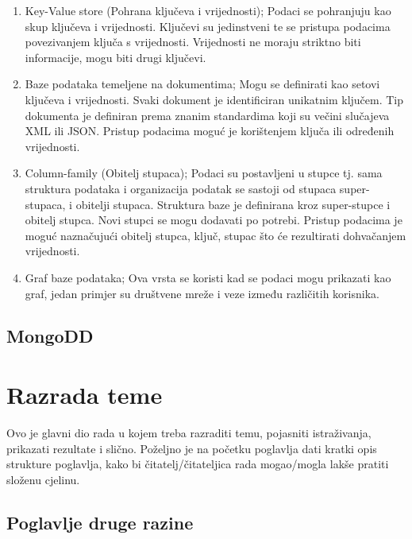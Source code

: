\documentclass[]{foi}
\begin{document}
\begin{enumerate}
    \item Key-Value store (Pohrana ključeva i vrijednosti); Podaci se pohranjuju kao skup ključeva i vrijednosti.
        Ključevi su jedinstveni te se pristupa podacima povezivanjem ključa s vrijednosti.
        Vrijednosti ne moraju striktno biti informacije, mogu biti drugi ključevi.
    \item Baze podataka temeljene na dokumentima; Mogu se definirati kao setovi ključeva i vrijednosti.
        Svaki dokument je identificiran unikatnim ključem. Tip dokumenta je definiran prema znanim standardima
        koji su večini slučajeva XML ili JSON. Pristup podacima moguć je korištenjem ključa ili određenih vrijednosti.
    \item Column-family (Obitelj stupaca); Podaci su postavljeni u stupce tj. sama struktura podataka i organizacija podatak
        se sastoji od stupaca super-stupaca, i obitelji stupaca. Struktura baze je definirana kroz super-stupce i obitelj stupca.
        Novi stupci se mogu dodavati po potrebi. Pristup podacima je moguć naznačujući obitelj stupca, ključ, stupac što će
        rezultirati dohvačanjem vrijednosti.
    \item Graf baze podataka; Ova vrsta se koristi kad se podaci mogu prikazati kao graf, jedan primjer su društvene mreže
        i veze između različitih korisnika.
\end{enumerate}

\section{MongoDD}


\chapter{Razrada teme}

Ovo je glavni dio rada u kojem treba razraditi temu, pojasniti istraživanja, prikazati rezultate i slično. Poželjno je na početku poglavlja dati kratki opis strukture poglavlja, kako bi čitatelj/čitateljica rada mogao/mogla lakše pratiti složenu cjelinu.



\section{Poglavlje druge razine }

\lipsum[6]
\end{document}
